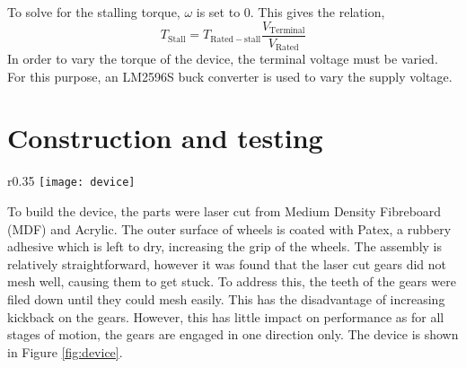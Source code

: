 \noindent To solve for the stalling torque, $\omega$ is set to $0$. This gives the relation,
\begin{equation}
	T_\mathrm{Stall} = T_\mathrm{Rated-stall}\frac{V_\mathrm{Terminal}}{V_\mathrm{Rated}}
\end{equation}
In order to vary the torque of the device, the terminal voltage must be varied. For this purpose, an LM2596S buck converter is used to vary the supply voltage.

\section{Construction and testing}\label{sec:construction}

\begin{wrapfigure}{r}{0.35\textwidth}
	\centering
	\texttt{[image: device]}
	\caption{Built device.}
	\label{fig:device}
\end{wrapfigure}

To build the device, the parts were laser cut from Medium Density Fibreboard (MDF) and Acrylic. The outer surface of wheels is coated with Patex, a rubbery adhesive which is left to dry, increasing the grip of the wheels. The assembly is relatively straightforward, however it was found that the laser cut gears did not mesh well, causing them to get stuck. To address this, the teeth of the gears were filed down until they could mesh easily. This has the disadvantage of increasing kickback on the gears. However, this has little impact on performance as for all stages of motion, the gears are engaged in one direction only. The device is shown in Figure \ref{fig:device}.\\


